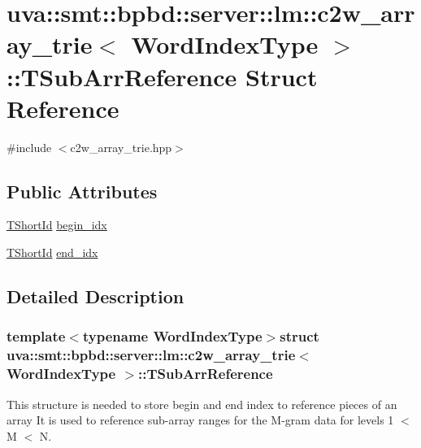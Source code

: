 \hypertarget{structuva_1_1smt_1_1bpbd_1_1server_1_1lm_1_1c2w__array__trie_1_1_t_sub_arr_reference}{}\section{uva\+:\+:smt\+:\+:bpbd\+:\+:server\+:\+:lm\+:\+:c2w\+\_\+array\+\_\+trie$<$ Word\+Index\+Type $>$\+:\+:T\+Sub\+Arr\+Reference Struct Reference}
\label{structuva_1_1smt_1_1bpbd_1_1server_1_1lm_1_1c2w__array__trie_1_1_t_sub_arr_reference}


{\ttfamily \#include $<$c2w\+\_\+array\+\_\+trie.\+hpp$>$}

\subsection*{Public Attributes}
\begin{DoxyCompactItemize}
\item 
\hyperlink{namespaceuva_1_1smt_1_1bpbd_1_1server_1_1lm_1_1identifiers_a33043a191e9a637dea742a89d23c8bdc}{T\+Short\+Id} \hyperlink{structuva_1_1smt_1_1bpbd_1_1server_1_1lm_1_1c2w__array__trie_1_1_t_sub_arr_reference_ad095148797875c69535b2bf69269cb39}{begin\+\_\+idx}
\item 
\hyperlink{namespaceuva_1_1smt_1_1bpbd_1_1server_1_1lm_1_1identifiers_a33043a191e9a637dea742a89d23c8bdc}{T\+Short\+Id} \hyperlink{structuva_1_1smt_1_1bpbd_1_1server_1_1lm_1_1c2w__array__trie_1_1_t_sub_arr_reference_ab6f97bbea4b4fef4ba31b69127037f03}{end\+\_\+idx}
\end{DoxyCompactItemize}


\subsection{Detailed Description}
\subsubsection*{template$<$typename Word\+Index\+Type$>$struct uva\+::smt\+::bpbd\+::server\+::lm\+::c2w\+\_\+array\+\_\+trie$<$ Word\+Index\+Type $>$\+::\+T\+Sub\+Arr\+Reference}

This structure is needed to store begin and end index to reference pieces of an array It is used to reference sub-\/array ranges for the M-\/gram data for levels 1 $<$ M $<$ N.

